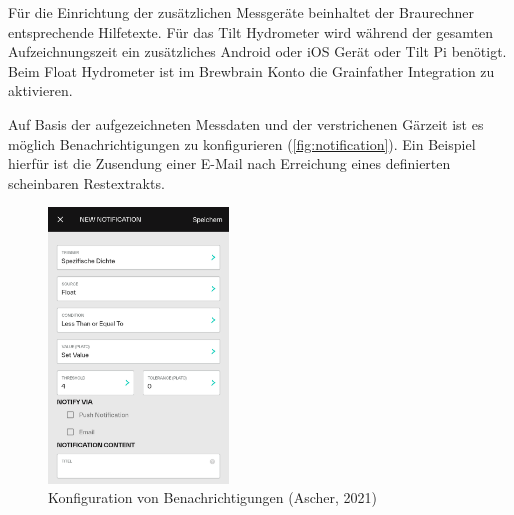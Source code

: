 \documentclass[a4paper,parskip=half]{scrartcl}
\begin{document}
Für die Einrichtung der zusätzlichen Messgeräte beinhaltet
der Braurechner entsprechende Hilfetexte. Für das
Tilt Hydrometer wird während der gesamten Aufzeichnungszeit ein
zusätzliches Android oder iOS Gerät oder Tilt Pi benötigt.
Beim Float Hydrometer  ist im Brewbrain Konto die Grainfather
Integration zu aktivieren.

Auf Basis der aufgezeichneten Messdaten und der verstrichenen
Gärzeit ist es möglich Benachrichtigungen zu konfigurieren
(\autoref{fig:notification}). Ein Beispiel hierfür ist
die Zusendung einer E-Mail nach Erreichung
eines definierten scheinbaren Restextrakts.

\begin{figure}[H]
\centering
\includegraphics[width=4.8cm]{images/gfpc_notification.png}
\caption{Konfiguration von Benachrichtigungen (Ascher, 2021)}
\label{fig:notification}
\end{figure}
\end{document}
